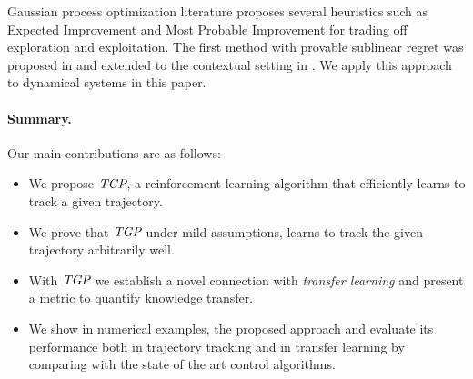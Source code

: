 Gaussian process optimization literature proposes several heuristics such as Expected Improvement \cite{Jones01} and Most Probable Improvement \cite{Lizotte07} for trading off exploration and exploitation. The first method with provable sublinear regret was proposed in \cite{Srinivas09} and extended to the contextual setting in \cite{Krause11}. We apply this approach to dynamical systems in this paper.

\paragraph*{Summary.} Our main contributions are as follows:

\begin{itemize}
\item We propose $\emph{TGP}$, a reinforcement learning algorithm that efficiently learns to track a given trajectory.
\item We prove that $\emph{TGP}$ under mild assumptions, learns to track the given trajectory arbitrarily well.
\item With $\emph{TGP}$ we establish a novel connection with \emph{transfer learning} and present a metric to quantify knowledge transfer. %
\item We show in numerical examples, the proposed approach and evaluate its performance both in trajectory tracking and in transfer learning by comparing with the state of the art control algorithms.
\end{itemize}

